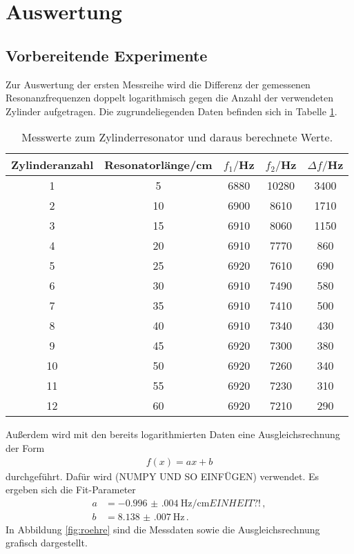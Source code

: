 \section{Auswertung}
\label{sec:Auswertung}

\subsection{Vorbereitende Experimente}
\label{subsec:vorbereitung}
Zur Auswertung der ersten Messreihe wird die Differenz der gemessenen
Resonanzfrequenzen doppelt logarithmisch gegen die Anzahl der verwendeten Zylinder
aufgetragen. Die zugrundeliegenden Daten befinden sich in Tabelle \ref{tab:zyl}.

\begin{table}[htp]
	\begin{center}
    \caption{Messwerte zum Zylinderresonator und daraus berechnete Werte.}
    \label{tab:zyl}
		\begin{tabular}{ccccc}
		\toprule
			{Zylinderanzahl} & {Resonatorlänge/cm} & {$f_1/$Hz} & {$f_2/$Hz} & {$\Delta f/$Hz}\\
			\midrule
			1 & 5 & 6880 & 10280 & 3400\\
			2 & 10 & 6900 & 8610 & 1710\\
			3 & 15 & 6910 & 8060 & 1150\\
			4 & 20 & 6910 & 7770 & 860\\
			5 & 25 & 6920 & 7610 & 690\\
			6 & 30 & 6910 & 7490 & 580\\
			7 & 35 & 6910 & 7410 & 500\\
			8 & 40 & 6910 & 7340 & 430\\
			9 & 45 & 6920 & 7300 & 380\\
			10 & 50 & 6920 & 7260 & 340\\
			11 & 55 & 6920 & 7230 & 310\\
			12 & 60 & 6920 & 7210 & 290\\
		\bottomrule
		\end{tabular}
	\end{center}
\end{table}


Außerdem wird mit den bereits logarithmierten Daten eine Ausgleichsrechnung der
Form
\begin{align*}
  f(x)=ax+b
\end{align*}
durchgeführt. Dafür wird (NUMPY UND SO EINFÜGEN) verwendet. Es ergeben sich die
Fit-Parameter
\begin{align*}
  a&=\SI{-0.996(004)}{\Hz\per\centi\metre} EINHEIT?!\,, \\
  b&=\SI{8.138(007)}{\Hz}\,.
\end{align*}
In Abbildung \ref{fig:roehre} sind die Messdaten sowie die Ausgleichsrechnung grafisch
dargestellt.

